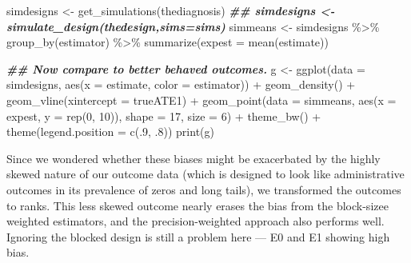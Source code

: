 \documentclass[
  12pt,
]{book}
\newenvironment{Shaded}{\begin{snugshade}}{\end{snugshade}}
\newcommand{\AttributeTok}[1]{\textcolor[rgb]{0.77,0.63,0.00}{#1}}
\newcommand{\DecValTok}[1]{\textcolor[rgb]{0.00,0.00,0.81}{#1}}
\newcommand{\DocumentationTok}[1]{\textcolor[rgb]{0.56,0.35,0.01}{\textbf{\textit{#1}}}}
\newcommand{\FunctionTok}[1]{\textcolor[rgb]{0.00,0.00,0.00}{#1}}
\newcommand{\NormalTok}[1]{#1}
\newcommand{\OtherTok}[1]{\textcolor[rgb]{0.56,0.35,0.01}{#1}}
\newcommand{\SpecialCharTok}[1]{\textcolor[rgb]{0.00,0.00,0.00}{#1}}
\theoremstyle{definition}
\theoremstyle{definition}
\theoremstyle{definition}
\theoremstyle{remark}
\begin{document}
\begin{Shaded}
\begin{Highlighting}[]
\NormalTok{simdesigns }\OtherTok{\textless{}{-}} \FunctionTok{get\_simulations}\NormalTok{(thediagnosis)}
\DocumentationTok{\#\# simdesigns \textless{}{-} simulate\_design(thedesign,sims=sims)}
\NormalTok{simmeans }\OtherTok{\textless{}{-}}\NormalTok{ simdesigns }\SpecialCharTok{\%\textgreater{}\%}
  \FunctionTok{group\_by}\NormalTok{(estimator) }\SpecialCharTok{\%\textgreater{}\%}
  \FunctionTok{summarize}\NormalTok{(}\AttributeTok{expest =} \FunctionTok{mean}\NormalTok{(estimate))}
\end{Highlighting}
\end{Shaded}

\begin{Shaded}
\begin{Highlighting}[]
\DocumentationTok{\#\# Now compare to better behaved outcomes.}
\NormalTok{g }\OtherTok{\textless{}{-}} \FunctionTok{ggplot}\NormalTok{(}\AttributeTok{data =}\NormalTok{ simdesigns, }\FunctionTok{aes}\NormalTok{(}\AttributeTok{x =}\NormalTok{ estimate, }\AttributeTok{color =}\NormalTok{ estimator)) }\SpecialCharTok{+}
  \FunctionTok{geom\_density}\NormalTok{() }\SpecialCharTok{+}
  \FunctionTok{geom\_vline}\NormalTok{(}\AttributeTok{xintercept =}\NormalTok{ trueATE1) }\SpecialCharTok{+}
  \FunctionTok{geom\_point}\NormalTok{(}\AttributeTok{data =}\NormalTok{ simmeans, }\FunctionTok{aes}\NormalTok{(}\AttributeTok{x =}\NormalTok{ expest, }\AttributeTok{y =} \FunctionTok{rep}\NormalTok{(}\DecValTok{0}\NormalTok{, }\DecValTok{10}\NormalTok{)), }\AttributeTok{shape =} \DecValTok{17}\NormalTok{, }\AttributeTok{size =} \DecValTok{6}\NormalTok{) }\SpecialCharTok{+}
  \FunctionTok{theme\_bw}\NormalTok{() }\SpecialCharTok{+}
  \FunctionTok{theme}\NormalTok{(}\AttributeTok{legend.position =} \FunctionTok{c}\NormalTok{(.}\DecValTok{9}\NormalTok{, .}\DecValTok{8}\NormalTok{))}
\FunctionTok{print}\NormalTok{(g)}
\end{Highlighting}
\end{Shaded}

Since we wondered whether these biases might be exacerbated by the
highly skewed nature of our outcome data (which is designed to look like
administrative outcomes in its prevalence of zeros and long tails), we
transformed the outcomes to ranks. This less skewed outcome nearly
erases the bias from the block-sizee weighted estimators, and the
precision-weighted approach also performs well. Ignoring the blocked
design is still a problem here --- E0 and E1 showing high bias.
\end{document}
